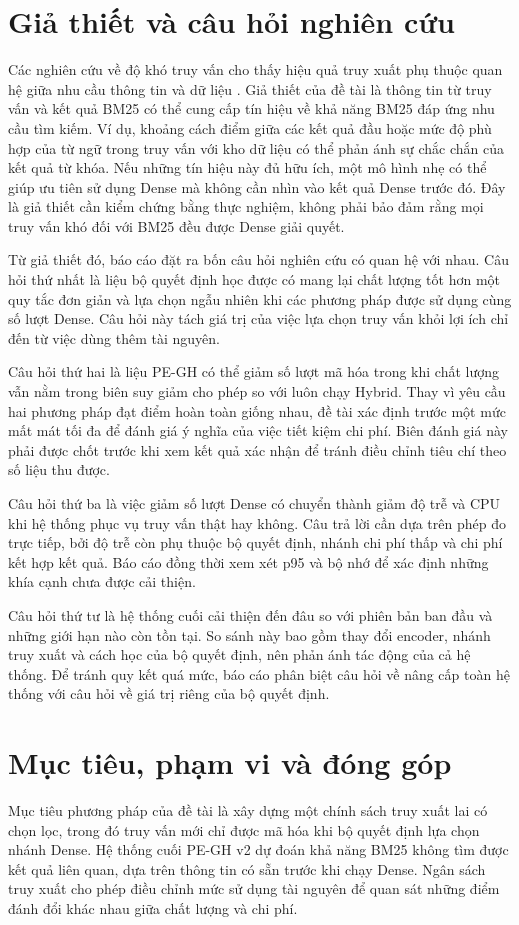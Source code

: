 \section{Giả thiết và câu hỏi nghiên cứu}
Các nghiên cứu về độ khó truy vấn cho thấy hiệu quả truy xuất phụ thuộc quan hệ giữa nhu cầu thông tin và dữ liệu \cite{querydifficulty2006}. Giả thiết của đề tài là thông tin từ truy vấn và kết quả BM25 có thể cung cấp tín hiệu về khả năng BM25 đáp ứng nhu cầu tìm kiếm. Ví dụ, khoảng cách điểm giữa các kết quả đầu hoặc mức độ phù hợp của từ ngữ trong truy vấn với kho dữ liệu có thể phản ánh sự chắc chắn của kết quả từ khóa. Nếu những tín hiệu này đủ hữu ích, một mô hình nhẹ có thể giúp ưu tiên sử dụng Dense mà không cần nhìn vào kết quả Dense trước đó. Đây là giả thiết cần kiểm chứng bằng thực nghiệm, không phải bảo đảm rằng mọi truy vấn khó đối với BM25 đều được Dense giải quyết.

Từ giả thiết đó, báo cáo đặt ra bốn câu hỏi nghiên cứu có quan hệ với nhau. Câu hỏi thứ nhất là liệu bộ quyết định học được có mang lại chất lượng tốt hơn một quy tắc đơn giản và lựa chọn ngẫu nhiên khi các phương pháp được sử dụng cùng số lượt Dense. Câu hỏi này tách giá trị của việc lựa chọn truy vấn khỏi lợi ích chỉ đến từ việc dùng thêm tài nguyên.

Câu hỏi thứ hai là liệu PE-GH có thể giảm số lượt mã hóa trong khi chất lượng vẫn nằm trong biên suy giảm cho phép so với luôn chạy Hybrid. Thay vì yêu cầu hai phương pháp đạt điểm hoàn toàn giống nhau, đề tài xác định trước một mức mất mát tối đa để đánh giá ý nghĩa của việc tiết kiệm chi phí. Biên đánh giá này phải được chốt trước khi xem kết quả xác nhận để tránh điều chỉnh tiêu chí theo số liệu thu được.

Câu hỏi thứ ba là việc giảm số lượt Dense có chuyển thành giảm độ trễ và CPU khi hệ thống phục vụ truy vấn thật hay không. Câu trả lời cần dựa trên phép đo trực tiếp, bởi độ trễ còn phụ thuộc bộ quyết định, nhánh chi phí thấp và chi phí kết hợp kết quả. Báo cáo đồng thời xem xét p95 và bộ nhớ để xác định những khía cạnh chưa được cải thiện.

Câu hỏi thứ tư là hệ thống cuối cải thiện đến đâu so với phiên bản ban đầu và những giới hạn nào còn tồn tại. So sánh này bao gồm thay đổi encoder, nhánh truy xuất và cách học của bộ quyết định, nên phản ánh tác động của cả hệ thống. Để tránh quy kết quá mức, báo cáo phân biệt câu hỏi về nâng cấp toàn hệ thống với câu hỏi về giá trị riêng của bộ quyết định.

\section{Mục tiêu, phạm vi và đóng góp}
Mục tiêu phương pháp của đề tài là xây dựng một chính sách truy xuất lai có chọn lọc, trong đó truy vấn mới chỉ được mã hóa khi bộ quyết định lựa chọn nhánh Dense. Hệ thống cuối PE-GH v2 dự đoán khả năng BM25 không tìm được kết quả liên quan, dựa trên thông tin có sẵn trước khi chạy Dense. Ngân sách truy xuất cho phép điều chỉnh mức sử dụng tài nguyên để quan sát những điểm đánh đổi khác nhau giữa chất lượng và chi phí.


